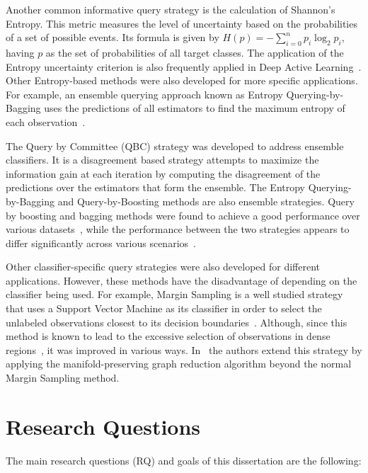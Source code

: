 Another common informative query strategy is the calculation of Shannon's
Entropy. This metric measures the level of uncertainty
based on the probabilities of a set of possible events. Its formula is given
by $H(p)=-\sum_{i=0}^n{p_i\log_2{p_i}}$, having $p$ as the set of
probabilities of all target classes. The application of the Entropy
uncertainty criterion is also frequently applied in Deep Active
Learning~\cite{Aghdam2019}. Other Entropy-based methods were also developed
for more specific applications. For example, an ensemble querying approach
known as Entropy Querying-by-Bagging uses the predictions of all estimators to
find the maximum entropy of each observation~\cite{Abe1998}.

The Query by Committee (QBC) strategy was developed to address ensemble
classifiers. It is a disagreement based strategy attempts to maximize the
information gain at each iteration by computing the disagreement of the
predictions over the estimators that form the ensemble. The Entropy
Querying-by-Bagging and Query-by-Boosting methods are also ensemble
strategies. Query by boosting and bagging methods were found to achieve a good
performance over various datasets~\cite{Melville2004}, while the performance
between the two strategies appears to differ significantly across various
scenarios~\cite{Bloodgood2018}.

Other classifier-specific query strategies were also developed for different
applications. However, these methods have the disadvantage of depending on the
classifier being used. For example, Margin Sampling is a well studied strategy
that uses a Support Vector Machine as its classifier in order to select the
unlabeled observations closest to its decision boundaries~\cite{Kumar2020}.
Although, since this method is known to lead to the excessive selection of
observations in dense regions~\cite{Zhou2014}, it was improved in various
ways. In~\cite{Zhou2014} the authors extend this strategy by applying the
manifold-preserving graph reduction algorithm beyond the normal Margin
Sampling method.


\section{Research Questions}

The main research questions (RQ) and goals of this dissertation are the
following:

